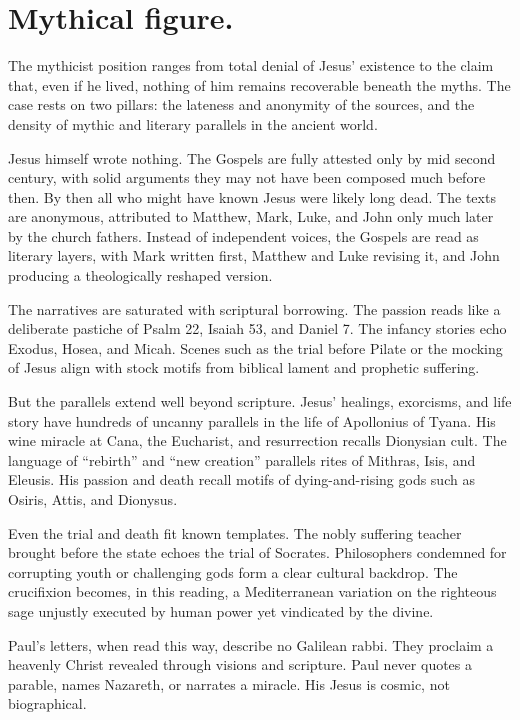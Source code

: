 \section{Mythical figure.}\label{sec:mythical}

The mythicist position ranges from total denial of Jesus’ existence to the claim that, even if he lived, nothing of him remains recoverable beneath the myths.
The case rests on two pillars: the lateness and anonymity of the sources, and the density of mythic and literary parallels in the ancient world.

Jesus himself wrote nothing.
The Gospels are fully attested only by mid second century, with solid arguments they may not have been composed much before then.
By then all who might have known Jesus were likely long dead.
The texts are anonymous, attributed to Matthew, Mark, Luke, and John only much later by the church fathers.
Instead of independent voices, the Gospels are read as literary layers, with Mark written first, Matthew and Luke revising it, and John producing a theologically reshaped version.

The narratives are saturated with scriptural borrowing.
The passion reads like a deliberate pastiche of Psalm 22, Isaiah 53, and Daniel 7.
The infancy stories echo Exodus, Hosea, and Micah.
Scenes such as the trial before Pilate or the mocking of Jesus align with stock motifs from biblical lament and prophetic suffering.

But the parallels extend well beyond scripture.
Jesus’ healings, exorcisms, and life story have hundreds of uncanny parallels in the life of Apollonius of Tyana.
His wine miracle at Cana, the Eucharist, and resurrection recalls Dionysian cult.
The language of “rebirth” and “new creation” parallels rites of Mithras, Isis, and Eleusis.
His passion and death recall motifs of dying-and-rising gods such as Osiris, Attis, and Dionysus.

Even the trial and death fit known templates.
The nobly suffering teacher brought before the state echoes the trial of Socrates.
Philosophers condemned for corrupting youth or challenging gods form a clear cultural backdrop.
The crucifixion becomes, in this reading, a Mediterranean variation on the righteous sage unjustly executed by human power yet vindicated by the divine.

Paul’s letters, when read this way, describe no Galilean rabbi.
They proclaim a heavenly Christ revealed through visions and scripture.
Paul never quotes a parable, names Nazareth, or narrates a miracle.
His Jesus is cosmic, not biographical.

